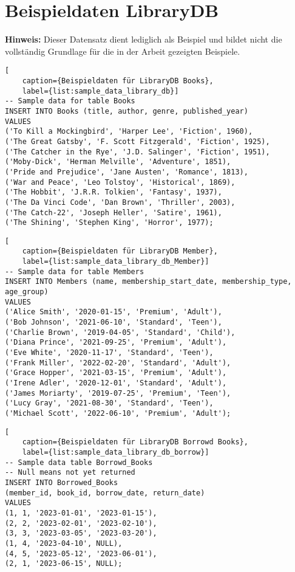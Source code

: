 \section*{Beispieldaten LibraryDB}
\label{sec:library_db_sample_data} \textbf{Hinweis:} Dieser Datensatz dient lediglich
als Beispiel und bildet nicht die vollständig Grundlage für die in der Arbeit gezeigten
Beispiele.

\begin{lstlisting}[
    caption={Beispieldaten für LibraryDB Books},
    label={list:sample_data_library_db}]
-- Sample data for table Books
INSERT INTO Books (title, author, genre, published_year)
VALUES
('To Kill a Mockingbird', 'Harper Lee', 'Fiction', 1960),
('The Great Gatsby', 'F. Scott Fitzgerald', 'Fiction', 1925),
('The Catcher in the Rye', 'J.D. Salinger', 'Fiction', 1951),
('Moby-Dick', 'Herman Melville', 'Adventure', 1851),
('Pride and Prejudice', 'Jane Austen', 'Romance', 1813),
('War and Peace', 'Leo Tolstoy', 'Historical', 1869),
('The Hobbit', 'J.R.R. Tolkien', 'Fantasy', 1937),
('The Da Vinci Code', 'Dan Brown', 'Thriller', 2003),
('The Catch-22', 'Joseph Heller', 'Satire', 1961),
('The Shining', 'Stephen King', 'Horror', 1977);
\end{lstlisting}

\begin{lstlisting}[
    caption={Beispieldaten für LibraryDB Member},
    label={list:sample_data_library_db_Member}]
-- Sample data for table Members
INSERT INTO Members (name, membership_start_date, membership_type, age_group)
VALUES
('Alice Smith', '2020-01-15', 'Premium', 'Adult'),
('Bob Johnson', '2021-06-10', 'Standard', 'Teen'),
('Charlie Brown', '2019-04-05', 'Standard', 'Child'),
('Diana Prince', '2021-09-25', 'Premium', 'Adult'),
('Eve White', '2020-11-17', 'Standard', 'Teen'),
('Frank Miller', '2022-02-20', 'Standard', 'Adult'),
('Grace Hopper', '2021-03-15', 'Premium', 'Adult'),
('Irene Adler', '2020-12-01', 'Standard', 'Adult'),
('James Moriarty', '2019-07-25', 'Premium', 'Teen'),
('Lucy Gray', '2021-08-30', 'Standard', 'Teen'),
('Michael Scott', '2022-06-10', 'Premium', 'Adult');
\end{lstlisting}

\filbreak

\begin{lstlisting}[
    caption={Beispieldaten für LibraryDB Borrowd Books},
    label={list:sample_data_library_db_borrow}]
-- Sample data table Borrowd_Books
-- Null means not yet returned
INSERT INTO Borrowed_Books
(member_id, book_id, borrow_date, return_date)
VALUES
(1, 1, '2023-01-01', '2023-01-15'),
(2, 2, '2023-02-01', '2023-02-10'),
(3, 3, '2023-03-05', '2023-03-20'),
(1, 4, '2023-04-10', NULL),
(4, 5, '2023-05-12', '2023-06-01'),
(2, 1, '2023-06-15', NULL);
\end{lstlisting}